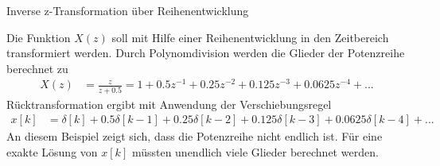 \begin{example}{Inverse z-Transformation über Reihenentwicklung}
\label{example:beispiel-inverse-z-transformation-uxfcber-reihenentwicklung}

Die Funktion \(X(z)\) soll mit Hilfe einer Reihenentwicklung in den Zeitbereich transformiert werden. Durch Polynomdivision werden die Glieder der Potenzreihe berechnet zu
\begin{align*}
X(z) &= \frac{z}{z + 0.5} = 1 + 0.5  z^{- 1} + 0.25  z^{- 2} + 0.125  z^{- 3} + 0.0625  z^{- 4} + ... 
\end{align*}
Rücktransformation ergibt mit Anwendung der Verschiebungsregel
\begin{align*}
x[ k] &= \delta[ k] + 0.5  \delta[ k - 1] + 0.25  \delta[ k - 2] + 0.125  \delta[ k - 3] + 0.0625  \delta[ k - 4] + ... 
\end{align*}
An diesem Beispiel zeigt sich, dass die Potenzreihe nicht endlich ist. Für eine exakte Lösung von \(x[k]\) müssten unendlich viele Glieder berechnet werden.

\end{example}

\protect{}\label{_Toc177369030}{}
